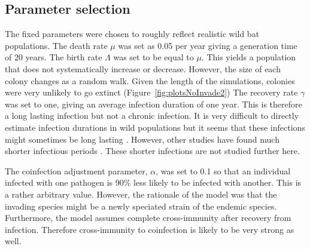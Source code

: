 


























\subsection{Parameter selection}
\label{s:paramSelect}

The fixed parameters were chosen to roughly reflect realistic wild bat populations. 
The death rate $\mu$ was set as 0.05 per year giving a generation time of 20 years.
The birth rate $\Lambda$ was set to be equal to $\mu$.
This yields a population that does not systematically increase or decrease.
However, the size of each colony changes as a random walk.
Given the length of the simulations, colonies were very unlikely to go extinct (Figure~\ref{fig:plotsNoInvade2})
The recovery rate $\gamma$ was set to one, giving an average infection duration of one year. 
This is therefore a long lasting infection but not a chronic infection. 
It is very difficult to directly estimate infection durations in wild populations but it seems that these infections might sometimes be long lasting \cite{peel2012henipavirus, plowright2015ecological}.
However, other studies have found much shorter infectious periods \cite{amengual2007temporal}.
These shorter infections are not studied further here. %

The coinfection adjustment parameter, $\alpha$, was set to 0.1 so that an individual infected with one pathogen is 90\% less likely to be infected with another.
This is a rather arbitrary value.
However, the rationale of the model was that the invading species might be a newly speciated strain of the endemic species.
Furthermore, the model assumes complete cross-immunity after recovery from infection.
Therefore cross-immunity to coinfection is likely to be very strong as well.

